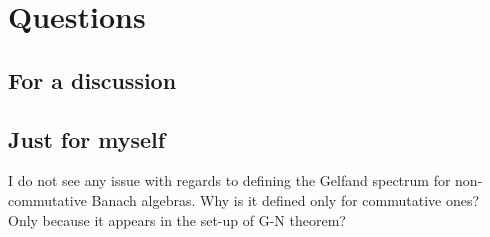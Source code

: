 \section{Questions}
\subsection{For a discussion}
\subsection{Just for myself}
\begin{quest}
I do not see any issue with regards to defining the Gelfand spectrum for non-commutative Banach algebras. Why is it defined only for commutative ones? Only because it appears in the set-up of G-N theorem?
\end{quest}
